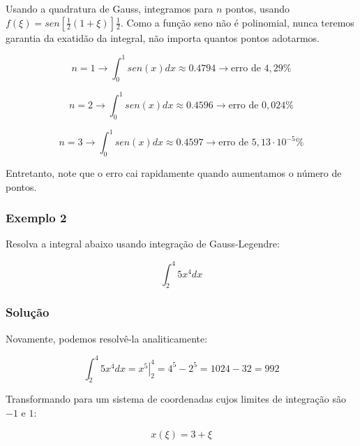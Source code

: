         Usando a quadratura de Gauss, integramos para $n$ pontos, usando $f(\xi) = sen\left[\frac{1}{2}\left(1+\xi\right)\right] \frac{1}{2}$. Como a função seno não é polinomial, nunca teremos garantia da exatidão da integral, não importa quantos pontos adotarmos.

        \begin{equation*}
            n = 1 \rightarrow \int_{0}^{1} sen(x) dx \approx 0.4794 \rightarrow \text{erro de } 4,29\% 
        \end{equation*}

        \begin{equation*}
            n = 2 \rightarrow \int_{0}^{1} sen(x) dx \approx 0.4596 \rightarrow \text{erro de } 0,024\% 
        \end{equation*}

        \begin{equation*}
            n = 3 \rightarrow \int_{0}^{1} sen(x) dx \approx 0.4597 \rightarrow \text{erro de } 5,13 \cdot 10^{-5}\% 
        \end{equation*}

        Entretanto, note que o erro cai rapidamente quando aumentamos o número de pontos. 


        \subsubsection{Exemplo 2}

        Resolva a integral abaixo usando integração de Gauss-Legendre:

         \begin{equation*}
            \int_{2}^{4} 5x^4 dx
        \end{equation*}

        \subsubsection*{Solução}

        Novamente, podemos resolvê-la analiticamente:

        \begin{equation*}
            \int_{2}^{4} 5x^4 dx = \left.x^5\right|_{2}^4 = 4^5 - 2^5 = 1024 - 32 = 992 
        \end{equation*}

        Transformando para um sistema de coordenadas cujos limites de integração são $-1$ e $1$:

        \begin{equation*}
            x(\xi) = 3+\xi
        \end{equation*}

